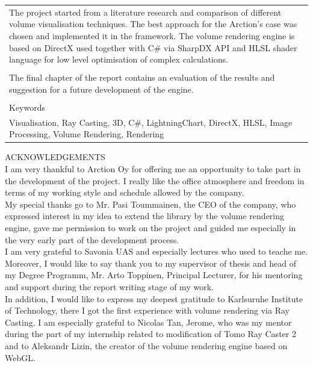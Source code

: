 \documentclass[twoside, english, 11pt]{report}
\begin{document}
\begin{table}[!h]
\begin{tabular}{| l | l | l | l |}
\multicolumn{4}{|p{14cm}|}{
The project started from a literature research and comparison of different volume visualisation techniques. The best approach for the Arction's case was chosen and implemented it in the framework. The volume rendering engine is based on DirectX used together with C\# via SharpDX API and HLSL shader language for low level optimisation of complex calculations.
}\\
\multicolumn{4}{|l|}{ }\\
\multicolumn{4}{|p{14cm}|}{
The final chapter of the report contains an evaluation of the results and suggestion for a future development of the engine.
}\\
\multicolumn{4}{|l|}{ }\\
\hline
\multicolumn{4}{|l|}{Keywords}\\
\multicolumn{4}{|p{14cm}|}{
Visualisation, Ray Casting, 3D, C\#, LightningChart, DirectX, HLSL, Image Processing, Volume Rendering, Rendering
}\\
\hline
\end{tabular}
\end{table}

\newpage

ACKNOWLEDGEMENTS\\

I am very thankful to Arction Oy for offering me an opportunity to take part in the development of the project. I really like the office atmosphere and freedom in terms of my working style and schedule allowed by the company.\\

My special thanks go to Mr. Pasi Toummainen, the CEO of the company, who expressed interest in my idea to extend the library by the volume rendering engine, gave me permission to work on the project and guided me especially in the very early part of the development process.\\

I am very grateful to Savonia UAS and especially lectures who used to teache me.  Moreover, I would like to say thank you to my supervisor of thesis and head of my Degree Programm, Mr. Arto Toppinen, Principal Lecturer, for his mentoring and support during the report writing stage of my work. \\

In addition, I would like to express my deepest gratitude to Karlsuruhe Institute of Technology, there I got the first experience with volume rendering via Ray Casting. I am especially grateful to Nicolas Tan, Jerome, who was my mentor during the part of my internship related to modification of Tomo Ray Caster 2 and to Aleksandr Lizin, the creator of the volume rendering engine based on WebGL.
\end{document}
